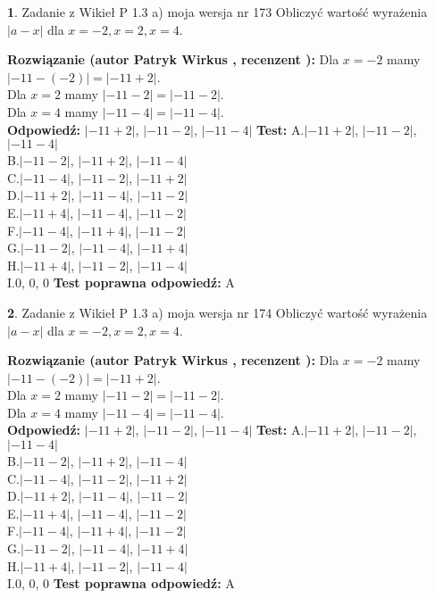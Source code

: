 \documentclass[12pt, a4paper]{article}
\theoremstyle{definition} %
\newtheorem{zad}{}
\newcommand{\zadStart}[1]{\begin{zad}#1\newline}
\newcommand{\zadStop}{\end{zad}}
\newcommand{\rozwStart}[2]{\noindent \textbf{Rozwiązanie (autor #1 , recenzent #2): }\newline}
\newcommand{\rozwStop}{\newline}
\newcommand{\odpStart}{\noindent \textbf{Odpowiedź:}\newline}
\newcommand{\odpStop}{\newline}
\newcommand{\testStart}{\noindent \textbf{Test:}\newline}
\newcommand{\testStop}{\newline}
\newcommand{\kluczStart}{\noindent \textbf{Test poprawna odpowiedź:}\newline}
\newcommand{\kluczStop}{\newline}
\begin{document}
\zadStart{Zadanie z Wikieł P 1.3 a) moja wersja nr 173}
Obliczyć wartość wyrażenia $|a - x|$ dla $x=-2,x=2,x=4$.
\zadStop
\rozwStart{Patryk Wirkus}{}
Dla $x = -2$ mamy $|-11 - (-2)| = |-11 + 2|$.\\
Dla $x = 2$ mamy $|-11 - 2| = |-11 - 2|$.\\
Dla $x = 4$ mamy $|-11 - 4| = |-11 - 4|$.\\
\rozwStop
\odpStart
$|-11 + 2|$, $|-11 - 2|$, $|-11 - 4|$
\odpStop
\testStart
A.$|-11 + 2|$, $|-11 - 2|$, $|-11 - 4|$\\
B.$|-11 - 2|$, $|-11 + 2|$, $|-11 - 4|$\\
C.$|-11 - 4|$, $|-11 - 2|$, $|-11 + 2|$\\
D.$|-11 + 2|$, $|-11 - 4|$, $|-11 - 2|$\\
E.$|-11 + 4|$, $|-11 - 4|$, $|-11 - 2|$\\
F.$|-11 - 4|$, $|-11 + 4|$, $|-11 - 2|$\\
G.$|-11 - 2|$, $|-11 - 4|$, $|-11 + 4|$\\
H.$|-11 + 4|$, $|-11 - 2|$, $|-11 - 4|$\\
I.$0$, $0$, $0$
\testStop
\kluczStart
A
\kluczStop



\zadStart{Zadanie z Wikieł P 1.3 a) moja wersja nr 174}
Obliczyć wartość wyrażenia $|a - x|$ dla $x=-2,x=2,x=4$.
\zadStop
\rozwStart{Patryk Wirkus}{}
Dla $x = -2$ mamy $|-11 - (-2)| = |-11 + 2|$.\\
Dla $x = 2$ mamy $|-11 - 2| = |-11 - 2|$.\\
Dla $x = 4$ mamy $|-11 - 4| = |-11 - 4|$.\\
\rozwStop
\odpStart
$|-11 + 2|$, $|-11 - 2|$, $|-11 - 4|$
\odpStop
\testStart
A.$|-11 + 2|$, $|-11 - 2|$, $|-11 - 4|$\\
B.$|-11 - 2|$, $|-11 + 2|$, $|-11 - 4|$\\
C.$|-11 - 4|$, $|-11 - 2|$, $|-11 + 2|$\\
D.$|-11 + 2|$, $|-11 - 4|$, $|-11 - 2|$\\
E.$|-11 + 4|$, $|-11 - 4|$, $|-11 - 2|$\\
F.$|-11 - 4|$, $|-11 + 4|$, $|-11 - 2|$\\
G.$|-11 - 2|$, $|-11 - 4|$, $|-11 + 4|$\\
H.$|-11 + 4|$, $|-11 - 2|$, $|-11 - 4|$\\
I.$0$, $0$, $0$
\testStop
\kluczStart
A
\kluczStop
\end{document}
